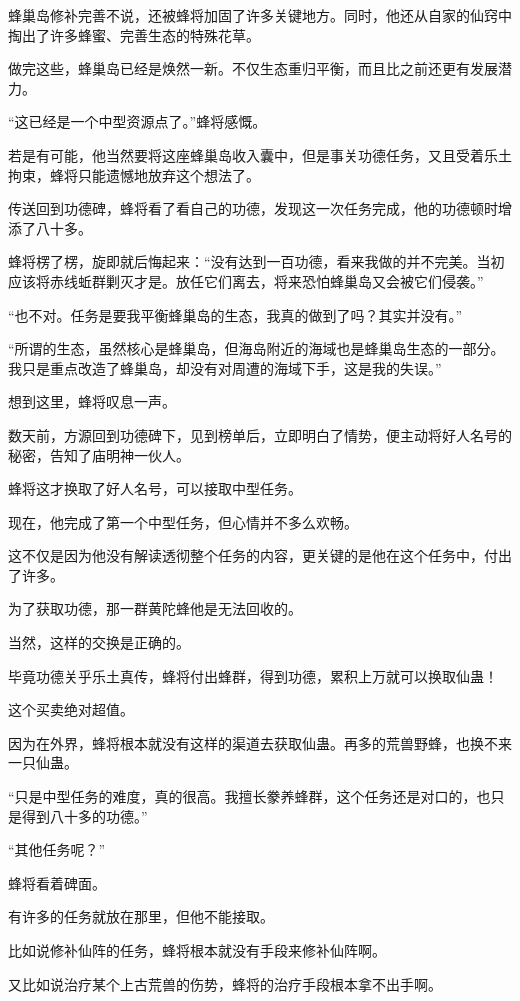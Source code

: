 \begin{this_body}
蜂巢岛修补完善不说，还被蜂将加固了许多关键地方。同时，他还从自家的仙窍中掏出了许多蜂蜜、完善生态的特殊花草。

做完这些，蜂巢岛已经是焕然一新。不仅生态重归平衡，而且比之前还更有发展潜力。

“这已经是一个中型资源点了。”蜂将感慨。

若是有可能，他当然要将这座蜂巢岛收入囊中，但是事关功德任务，又且受着乐土拘束，蜂将只能遗憾地放弃这个想法了。

传送回到功德碑，蜂将看了看自己的功德，发现这一次任务完成，他的功德顿时增添了八十多。

蜂将楞了楞，旋即就后悔起来：“没有达到一百功德，看来我做的并不完美。当初应该将赤线蚯群剿灭才是。放任它们离去，将来恐怕蜂巢岛又会被它们侵袭。”

“也不对。任务是要我平衡蜂巢岛的生态，我真的做到了吗？其实并没有。”

“所谓的生态，虽然核心是蜂巢岛，但海岛附近的海域也是蜂巢岛生态的一部分。我只是重点改造了蜂巢岛，却没有对周遭的海域下手，这是我的失误。”

想到这里，蜂将叹息一声。

数天前，方源回到功德碑下，见到榜单后，立即明白了情势，便主动将好人名号的秘密，告知了庙明神一伙人。

蜂将这才换取了好人名号，可以接取中型任务。

现在，他完成了第一个中型任务，但心情并不多么欢畅。

这不仅是因为他没有解读透彻整个任务的内容，更关键的是他在这个任务中，付出了许多。

为了获取功德，那一群黄陀蜂他是无法回收的。

当然，这样的交换是正确的。

毕竟功德关乎乐土真传，蜂将付出蜂群，得到功德，累积上万就可以换取仙蛊！

这个买卖绝对超值。

因为在外界，蜂将根本就没有这样的渠道去获取仙蛊。再多的荒兽野蜂，也换不来一只仙蛊。

“只是中型任务的难度，真的很高。我擅长豢养蜂群，这个任务还是对口的，也只是得到八十多的功德。”

“其他任务呢？”

蜂将看着碑面。

有许多的任务就放在那里，但他不能接取。

比如说修补仙阵的任务，蜂将根本就没有手段来修补仙阵啊。

又比如说治疗某个上古荒兽的伤势，蜂将的治疗手段根本拿不出手啊。


\end{this_body}
